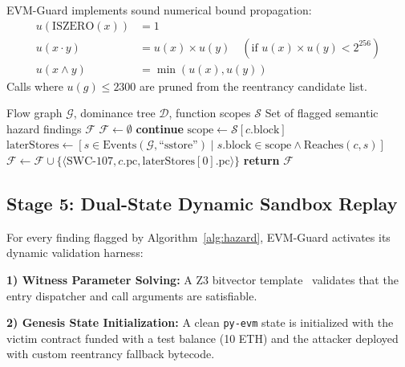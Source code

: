 \documentclass[conference]{IEEEtran}
\begin{document}
EVM-Guard implements sound numerical bound propagation:
\begin{align}
u(\mathrm{ISZERO}(x)) &= 1 \\
u(x \cdot y) &= u(x) \times u(y) \quad (\text{if } u(x) \times u(y) < 2^{256}) \\
u(x \land y) &= \min(u(x), u(y))
\end{align}
Calls where $u(g) \le 2300$ are pruned from the reentrancy candidate list.

\begin{algorithm}[t]
\caption{Path-Sensitive Reentrancy and Hazard Checking}
\label{alg:hazard}
\begin{algorithmic}[1]
\REQUIRE Flow graph $\mathcal{G}$, dominance tree $\mathcal{D}$, function scopes $\mathcal{S}$
\ENSURE Set of flagged semantic hazard findings $\mathcal{F}$
\STATE $\mathcal{F} \leftarrow \emptyset$
        \STATE \textbf{continue}
    \ENDIF
    \STATE $\mathrm{scope} \leftarrow \mathcal{S}[c.\mathrm{block}]$
    \STATE $\mathrm{laterStores} \leftarrow [s \in \mathrm{Events}(\mathcal{G}, \text{``sstore''}) \mid s.\mathrm{block} \in \mathrm{scope} \land \mathrm{Reaches}(c, s)]$
        \STATE $\mathcal{F} \leftarrow \mathcal{F} \cup \{\langle \text{SWC-107}, c.\mathrm{pc}, \mathrm{laterStores}[0].\mathrm{pc} \rangle\}$
    \ENDIF
\ENDFOR
\STATE \textbf{return} $\mathcal{F}$
\end{algorithmic}
\end{algorithm}

\subsection{Stage 5: Dual-State Dynamic Sandbox Replay}
For every finding flagged by Algorithm~\ref{alg:hazard}, EVM-Guard activates its dynamic validation harness:

\smallskip
\noindent\textbf{1) Witness Parameter Solving:} A Z3 bitvector template~\cite{de2008z3} validates that the entry dispatcher and call arguments are satisfiable.

\smallskip
\noindent\textbf{2) Genesis State Initialization:} A clean \texttt{py-evm} state is initialized with the victim contract funded with a test balance (10 ETH) and the attacker deployed with custom reentrancy fallback bytecode.
\end{document}
